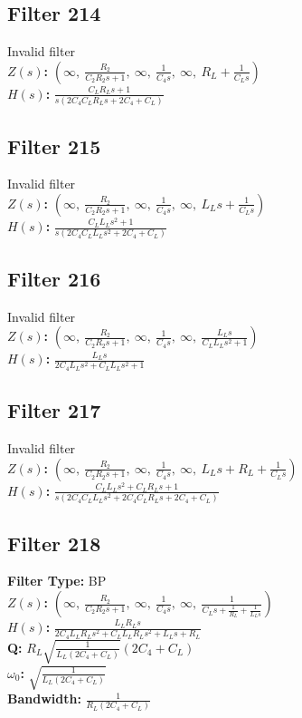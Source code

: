 \documentclass{article}
\begin{document}
\subsection*{Filter 214}
Invalid filter \\ 
\textbf{$Z(s)$:} $\left( \infty, \  \frac{R_{2}}{C_{2} R_{2} s + 1}, \  \infty, \  \frac{1}{C_{4} s}, \  \infty, \  R_{L} + \frac{1}{C_{L} s}\right)$ \\ 
\textbf{$H(s)$:} $\frac{C_{L} R_{L} s + 1}{s \left(2 C_{4} C_{L} R_{L} s + 2 C_{4} + C_{L}\right)}$ \\ 
\subsection*{Filter 215}
Invalid filter \\ 
\textbf{$Z(s)$:} $\left( \infty, \  \frac{R_{2}}{C_{2} R_{2} s + 1}, \  \infty, \  \frac{1}{C_{4} s}, \  \infty, \  L_{L} s + \frac{1}{C_{L} s}\right)$ \\ 
\textbf{$H(s)$:} $\frac{C_{L} L_{L} s^{2} + 1}{s \left(2 C_{4} C_{L} L_{L} s^{2} + 2 C_{4} + C_{L}\right)}$ \\ 
\subsection*{Filter 216}
Invalid filter \\ 
\textbf{$Z(s)$:} $\left( \infty, \  \frac{R_{2}}{C_{2} R_{2} s + 1}, \  \infty, \  \frac{1}{C_{4} s}, \  \infty, \  \frac{L_{L} s}{C_{L} L_{L} s^{2} + 1}\right)$ \\ 
\textbf{$H(s)$:} $\frac{L_{L} s}{2 C_{4} L_{L} s^{2} + C_{L} L_{L} s^{2} + 1}$ \\ 
\subsection*{Filter 217}
Invalid filter \\ 
\textbf{$Z(s)$:} $\left( \infty, \  \frac{R_{2}}{C_{2} R_{2} s + 1}, \  \infty, \  \frac{1}{C_{4} s}, \  \infty, \  L_{L} s + R_{L} + \frac{1}{C_{L} s}\right)$ \\ 
\textbf{$H(s)$:} $\frac{C_{L} L_{L} s^{2} + C_{L} R_{L} s + 1}{s \left(2 C_{4} C_{L} L_{L} s^{2} + 2 C_{4} C_{L} R_{L} s + 2 C_{4} + C_{L}\right)}$ \\ 
\subsection*{Filter 218}
\textbf{Filter Type:} BP \\ 
\textbf{$Z(s)$:} $\left( \infty, \  \frac{R_{2}}{C_{2} R_{2} s + 1}, \  \infty, \  \frac{1}{C_{4} s}, \  \infty, \  \frac{1}{C_{L} s + \frac{1}{R_{L}} + \frac{1}{L_{L} s}}\right)$ \\ 
\textbf{$H(s)$:} $\frac{L_{L} R_{L} s}{2 C_{4} L_{L} R_{L} s^{2} + C_{L} L_{L} R_{L} s^{2} + L_{L} s + R_{L}}$ \\ 
\textbf{Q:} $R_{L} \sqrt{\frac{1}{L_{L} \left(2 C_{4} + C_{L}\right)}} \left(2 C_{4} + C_{L}\right)$ \\ 
\textbf{$\omega_0$:} $\sqrt{\frac{1}{L_{L} \left(2 C_{4} + C_{L}\right)}}$ \\ 
\textbf{Bandwidth:} $\frac{1}{R_{L} \left(2 C_{4} + C_{L}\right)}$ \\ 
\end{document}
